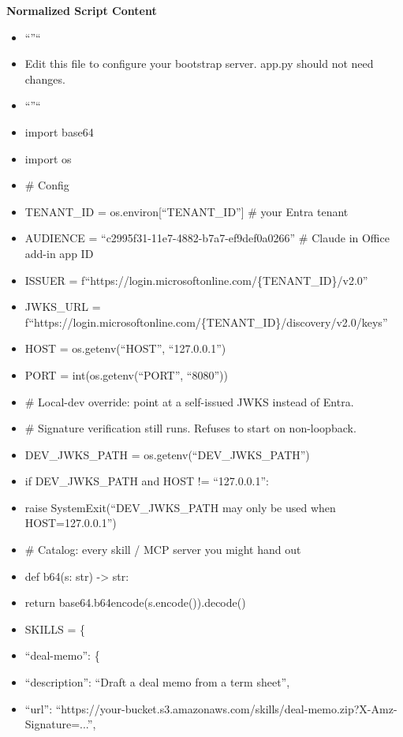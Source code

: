 \documentclass[11pt]{article}
\begin{document}
\textbf{Normalized Script Content}
\begin{itemize}[leftmargin=*,itemsep=2pt,topsep=2pt]
\item {} ``''``
\item {} Edit this file to configure your bootstrap server. app.py should not need changes.
\item {} ``''``
\item {} import base64
\item {} import os
\item {} \# Config
\item {} TENANT\_\allowbreak{}ID = os.environ[``TENANT\_\allowbreak{}ID''] \# your Entra tenant
\item {} AUDIENCE = ``c2995f31-11e7-4882-b7a7-ef9def0a0266'' \# Claude in Office add-in app ID
\item {} ISSUER = f``https://login.microsoftonline.com/\{TENANT\_\allowbreak{}ID\}/v2.0''
\item {} JWKS\_\allowbreak{}URL = f``https://login.microsoftonline.com/\{TENANT\_\allowbreak{}ID\}/discovery/v2.0/keys''
\item {} HOST = os.getenv(``HOST'', ``127.0.0.1'')
\item {} PORT = int(os.getenv(``PORT'', ``8080''))
\item {} \# Local-dev override: point at a self-issued JWKS instead of Entra.
\item {} \# Signature verification still runs. Refuses to start on non-loopback.
\item {} DEV\_\allowbreak{}JWKS\_\allowbreak{}PATH = os.getenv(``DEV\_\allowbreak{}JWKS\_\allowbreak{}PATH'')
\item {} if DEV\_\allowbreak{}JWKS\_\allowbreak{}PATH and HOST != ``127.0.0.1'':
\item {} raise SystemExit(``DEV\_\allowbreak{}JWKS\_\allowbreak{}PATH may only be used when HOST=127.0.0.1'')
\item {} \# Catalog: every skill / MCP server you might hand out
\item {} def b64(s: str) -> str:
\item {} return base64.b64encode(s.encode()).decode()
\item {} SKILLS = \{
\item {} ``deal-memo'': \{
\item {} ``description'': ``Draft a deal memo from a term sheet'',
\item {} ``url'': ``https://your-bucket.s3.amazonaws.com/skills/deal-memo.zip?X-Amz-Signature=...'',

\end{itemize}
\end{document}
